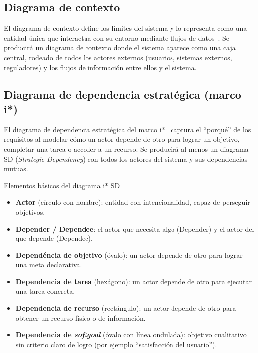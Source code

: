 \documentclass[11pt,a4paper]{article}
\begin{document}
\subsection{Diagrama de contexto}

El diagrama de contexto define los l\'imites del sistema y lo representa como una entidad \'unica que interact\'ua con su entorno mediante flujos de datos~\cite{kossiakoff2011systems,robertson2012mastering}. Se producir\'a un diagrama de contexto donde el sistema aparece como una caja central, rodeado de todos los actores externos (usuarios, sistemas externos, reguladores) y los flujos de informaci\'on entre ellos y el sistema.

\subsection{Diagrama de dependencia estrat\'egica (marco i*)}

El diagrama de dependencia estrat\'egica del marco i*~\cite{yu1997istar,dardenne1993kaos} captura el ``porqu\'e'' de los requisitos al modelar c\'omo un actor depende de otro para lograr un objetivo, completar una tarea o acceder a un recurso. Se producir\'a al menos un diagrama SD (\emph{Strategic Dependency}) con todos los actores del sistema y sus dependencias mutuas.

\begin{cajaconcepto}{Elementos b\'asicos del diagrama i* SD}
\begin{itemize}
    \item \textbf{Actor} (c\'irculo con nombre): entidad con intencionalidad, capaz de perseguir objetivos.
    \item \textbf{Depender / Dependee}: el actor que necesita algo (Depender) y el actor del que depende (Dependee).
    \item \textbf{Depend\'encia de objetivo} (\'ovalo): un actor depende de otro para lograr una meta declarativa.
    \item \textbf{Dependencia de tarea} (hex\'agono): un actor depende de otro para ejecutar una tarea concreta.
    \item \textbf{Dependencia de recurso} (rect\'angulo): un actor depende de otro para obtener un recurso f\'isico o de informaci\'on.
    \item \textbf{Dependencia de \emph{softgoal}} (\'ovalo con l\'inea ondulada): objetivo cualitativo sin criterio claro de logro (por ejemplo ``satisfacci\'on del usuario'').
\end{itemize}
\end{cajaconcepto}
\end{document}
